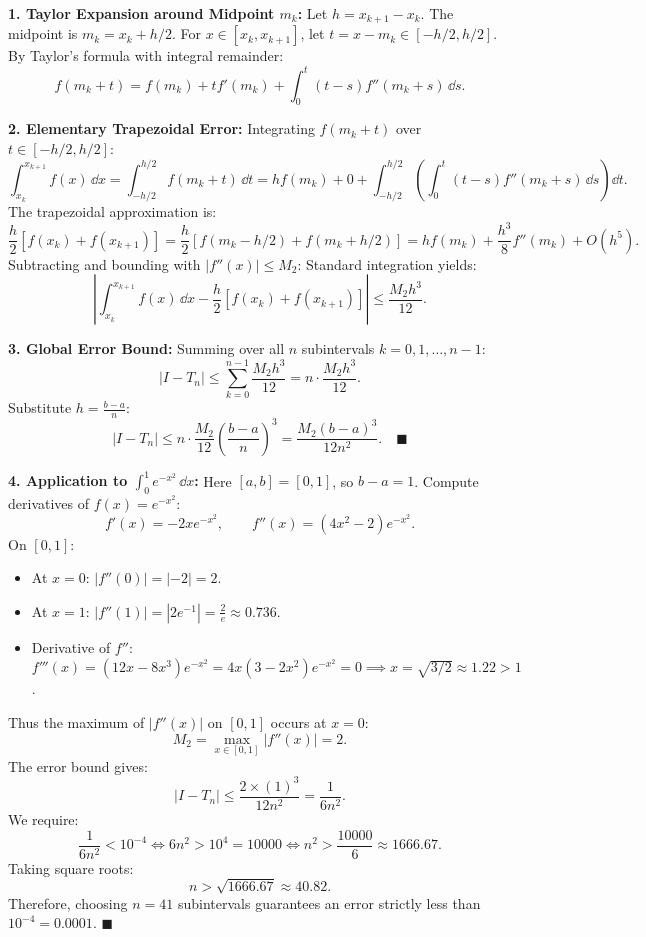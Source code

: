 \begin{solution}
\textbf{1. Taylor Expansion around Midpoint $m_k$:}
Let $h = x_{k+1} - x_k$. The midpoint is $m_k = x_k + h/2$.
For $x \in [x_k, x_{k+1}]$, let $t = x - m_k \in [-h/2, h/2]$.
By Taylor's formula with integral remainder:
\[
f(m_k + t) = f(m_k) + t f'(m_k) + \int_0^t (t - s) f''(m_k + s)\,\dd s.
\]

\textbf{2. Elementary Trapezoidal Error:}
Integrating $f(m_k + t)$ over $t \in [-h/2, h/2]$:
\[
\int_{x_k}^{x_{k+1}} f(x)\,\dd x = \int_{-h/2}^{h/2} f(m_k + t)\,\dd t = h f(m_k) + 0 + \int_{-h/2}^{h/2} \left( \int_0^t (t - s)f''(m_k + s)\,\dd s \right)\dd t.
\]
The trapezoidal approximation is:
\[
\frac{h}{2}[f(x_k) + f(x_{k+1})] = \frac{h}{2}\left[ f(m_k - h/2) + f(m_k + h/2) \right] = h f(m_k) + \frac{h^3}{8} f''(m_k) + O(h^5).
\]
Subtracting and bounding with $|f''(x)| \le M_2$:
Standard integration yields:
\[
\left| \int_{x_k}^{x_{k+1}} f(x)\,\dd x - \frac{h}{2}[f(x_k) + f(x_{k+1})] \right| \le \frac{M_2 h^3}{12}.
\]

\textbf{3. Global Error Bound:}
Summing over all $n$ subintervals $k = 0, 1, \dots, n - 1$:
\[
|I - T_n| \le \sum_{k=0}^{n-1} \frac{M_2 h^3}{12} = n \cdot \frac{M_2 h^3}{12}.
\]
Substitute $h = \frac{b - a}{n}$:
\[
|I - T_n| \le n \cdot \frac{M_2}{12}\left(\frac{b - a}{n}\right)^3 = \frac{M_2 (b - a)^3}{12 n^2}. \quad \blacksquare
\]

\textbf{4. Application to $\int_0^1 e^{-x^2}\,\dd x$:}
Here $[a, b] = [0, 1]$, so $b - a = 1$.
Compute derivatives of $f(x) = e^{-x^2}$:
\[
f'(x) = -2x e^{-x^2}, \qquad f''(x) = (4x^2 - 2)e^{-x^2}.
\]
On $[0, 1]$:
\begin{itemize}[leftmargin=1.5em,itemsep=1pt]
  \item At $x = 0$: $|f''(0)| = |-2| = 2$.
  \item At $x = 1$: $|f''(1)| = |2 e^{-1}| = \frac{2}{e} \approx 0.736$.
  \item Derivative of $f''$: $f'''(x) = (12x - 8x^3)e^{-x^2} = 4x(3 - 2x^2)e^{-x^2} = 0 \implies x = \sqrt{3/2} \approx 1.22 > 1$.
\end{itemize}
Thus the maximum of $|f''(x)|$ on $[0, 1]$ occurs at $x = 0$:
\[
M_2 = \max_{x \in [0, 1]} |f''(x)| = 2.
\]
The error bound gives:
\[
|I - T_n| \le \frac{2 \times (1)^3}{12 n^2} = \frac{1}{6n^2}.
\]
We require:
\[
\frac{1}{6n^2} < 10^{-4} \iff 6n^2 > 10^4 = 10000 \iff n^2 > \frac{10000}{6} \approx 1666.67.
\]
Taking square roots:
\[
n > \sqrt{1666.67} \approx 40.82.
\]
Therefore, choosing $n = 41$ subintervals guarantees an error strictly less than $10^{-4} = 0.0001$. \hfill $\blacksquare$
\end{solution}
